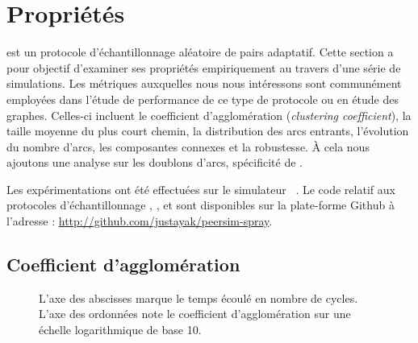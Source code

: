 
\section{Propriétés}
\label{net:sec:properties}

\SPRAY est un protocole d'échantillonnage aléatoire de pairs adaptatif. Cette
section a pour objectif d'examiner ses propriétés empiriquement au travers d'une
série de simulations. Les métriques auxquelles nous nous intéressons sont
communément employées dans l'étude de performance de ce type de protocole ou en
étude des graphes. Celles-ci incluent le coefficient d'agglomération
(\emph{clustering coefficient}), la taille moyenne du plus court chemin, la
distribution des arcs entrants, l'évolution du nombre d'arcs, les composantes
connexes et la robustesse. À cela nous ajoutons une analyse sur les doublons
d'arcs, spécificité de \SPRAY.

Les expérimentations ont été effectuées sur le simulateur
\PEERSIM~\cite{montresor2009peersim}. Le code relatif aux protocoles
d'échantillonnage \CYCLON, \SCAMP, et \SPRAY sont disponibles sur la
plate-forme Github à l'adresse : \url{http://github.com/justayak/peersim-spray}.

\subsection{Coefficient d'agglomération}
\label{net:subsec:clustering}

\begin{figure}
  \centering
  \hspace{10pt}
  \caption[Coefficient d'agglomération]{\label{net:fig:clustering}L'axe des
    abscisses marque le temps écoulé en nombre de cycles. L'axe des ordonnées
    note le coefficient d'agglomération sur une échelle logarithmique de base
    10.}
\end{figure}

